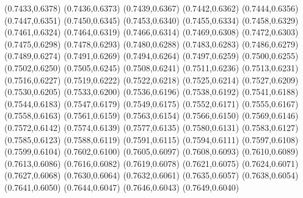 \PST@Filltriangle(0.7433,0.6378)
\PST@Filltriangle(0.7436,0.6373)
\PST@Filltriangle(0.7439,0.6367)
\PST@Filltriangle(0.7442,0.6362)
\PST@Filltriangle(0.7444,0.6356)
\PST@Filltriangle(0.7447,0.6351)
\PST@Filltriangle(0.7450,0.6345)
\PST@Filltriangle(0.7453,0.6340)
\PST@Filltriangle(0.7455,0.6334)
\PST@Filltriangle(0.7458,0.6329)
\PST@Filltriangle(0.7461,0.6324)
\PST@Filltriangle(0.7464,0.6319)
\PST@Filltriangle(0.7466,0.6314)
\PST@Filltriangle(0.7469,0.6308)
\PST@Filltriangle(0.7472,0.6303)
\PST@Filltriangle(0.7475,0.6298)
\PST@Filltriangle(0.7478,0.6293)
\PST@Filltriangle(0.7480,0.6288)
\PST@Filltriangle(0.7483,0.6283)
\PST@Filltriangle(0.7486,0.6279)
\PST@Filltriangle(0.7489,0.6274)
\PST@Filltriangle(0.7491,0.6269)
\PST@Filltriangle(0.7494,0.6264)
\PST@Filltriangle(0.7497,0.6259)
\PST@Filltriangle(0.7500,0.6255)
\PST@Filltriangle(0.7502,0.6250)
\PST@Filltriangle(0.7505,0.6245)
\PST@Filltriangle(0.7508,0.6241)
\PST@Filltriangle(0.7511,0.6236)
\PST@Filltriangle(0.7513,0.6231)
\PST@Filltriangle(0.7516,0.6227)
\PST@Filltriangle(0.7519,0.6222)
\PST@Filltriangle(0.7522,0.6218)
\PST@Filltriangle(0.7525,0.6214)
\PST@Filltriangle(0.7527,0.6209)
\PST@Filltriangle(0.7530,0.6205)
\PST@Filltriangle(0.7533,0.6200)
\PST@Filltriangle(0.7536,0.6196)
\PST@Filltriangle(0.7538,0.6192)
\PST@Filltriangle(0.7541,0.6188)
\PST@Filltriangle(0.7544,0.6183)
\PST@Filltriangle(0.7547,0.6179)
\PST@Filltriangle(0.7549,0.6175)
\PST@Filltriangle(0.7552,0.6171)
\PST@Filltriangle(0.7555,0.6167)
\PST@Filltriangle(0.7558,0.6163)
\PST@Filltriangle(0.7561,0.6159)
\PST@Filltriangle(0.7563,0.6154)
\PST@Filltriangle(0.7566,0.6150)
\PST@Filltriangle(0.7569,0.6146)
\PST@Filltriangle(0.7572,0.6142)
\PST@Filltriangle(0.7574,0.6139)
\PST@Filltriangle(0.7577,0.6135)
\PST@Filltriangle(0.7580,0.6131)
\PST@Filltriangle(0.7583,0.6127)
\PST@Filltriangle(0.7585,0.6123)
\PST@Filltriangle(0.7588,0.6119)
\PST@Filltriangle(0.7591,0.6115)
\PST@Filltriangle(0.7594,0.6111)
\PST@Filltriangle(0.7597,0.6108)
\PST@Filltriangle(0.7599,0.6104)
\PST@Filltriangle(0.7602,0.6100)
\PST@Filltriangle(0.7605,0.6097)
\PST@Filltriangle(0.7608,0.6093)
\PST@Filltriangle(0.7610,0.6089)
\PST@Filltriangle(0.7613,0.6086)
\PST@Filltriangle(0.7616,0.6082)
\PST@Filltriangle(0.7619,0.6078)
\PST@Filltriangle(0.7621,0.6075)
\PST@Filltriangle(0.7624,0.6071)
\PST@Filltriangle(0.7627,0.6068)
\PST@Filltriangle(0.7630,0.6064)
\PST@Filltriangle(0.7632,0.6061)
\PST@Filltriangle(0.7635,0.6057)
\PST@Filltriangle(0.7638,0.6054)
\PST@Filltriangle(0.7641,0.6050)
\PST@Filltriangle(0.7644,0.6047)
\PST@Filltriangle(0.7646,0.6043)
\PST@Filltriangle(0.7649,0.6040)

